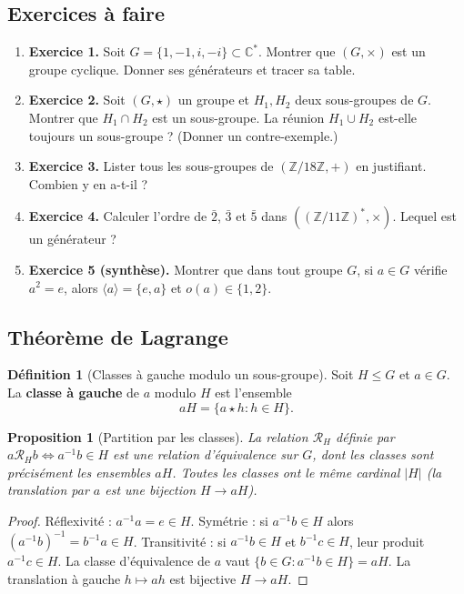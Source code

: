 \documentclass[12pt,a4paper]{report}
\newtheorem{proposition}[theoreme]{Proposition}
\theoremstyle{definition}
\newtheorem{definition}{Définition}[section]
\theoremstyle{remark}
\begin{document}
\subsection{Exercices à faire}
\begin{enumerate}
    \item \textbf{Exercice 1.} Soit $G = \{1, -1, i, -i\} \subset \mathbb{C}^*$. Montrer que $(G, \times)$ est un groupe cyclique. Donner ses générateurs et tracer sa table.
    \item \textbf{Exercice 2.} Soit $(G, \star)$ un groupe et $H_1, H_2$ deux sous-groupes de $G$. Montrer que $H_1 \cap H_2$ est un sous-groupe. La réunion $H_1 \cup H_2$ est-elle toujours un sous-groupe ? (Donner un contre-exemple.)
    \item \textbf{Exercice 3.} Lister tous les sous-groupes de $(\mathbb{Z}/18\mathbb{Z}, +)$ en justifiant. Combien y en a-t-il ?
    \item \textbf{Exercice 4.} Calculer l'ordre de $\bar{2}$, $\bar{3}$ et $\bar{5}$ dans $((\mathbb{Z}/11\mathbb{Z})^*, \times)$. Lequel est un générateur ?
    \item \textbf{Exercice 5 (synthèse).} Montrer que dans tout groupe $G$, si $a \in G$ vérifie $a^2 = e$, alors $\langle a \rangle = \{e, a\}$ et $o(a) \in \{1, 2\}$.
\end{enumerate}

\subsection{Théorème de Lagrange}

\begin{definition}[Classes à gauche modulo un sous-groupe]
Soit $H \le G$ et $a \in G$. La \textbf{classe à gauche} de $a$ modulo $H$ est l'ensemble
\[ aH = \{a \star h : h \in H\}. \]
\end{definition}

\begin{proposition}[Partition par les classes]
La relation $\mathcal{R}_H$ définie par $a \mathcal{R}_H b \iff a^{-1}b \in H$ est une relation d'équivalence sur $G$, dont les classes sont précisément les ensembles $aH$. Toutes les classes ont le même cardinal $|H|$ (la translation par $a$ est une bijection $H \to aH$).
\end{proposition}

\begin{proof}
Réflexivité : $a^{-1}a = e \in H$. Symétrie : si $a^{-1}b \in H$ alors $(a^{-1}b)^{-1} = b^{-1}a \in H$. Transitivité : si $a^{-1}b \in H$ et $b^{-1}c \in H$, leur produit $a^{-1}c \in H$. La classe d'équivalence de $a$ vaut $\{b \in G : a^{-1}b \in H\} = a H$. La translation à gauche $h \mapsto ah$ est bijective $H \to aH$.
\end{proof}
\end{document}

